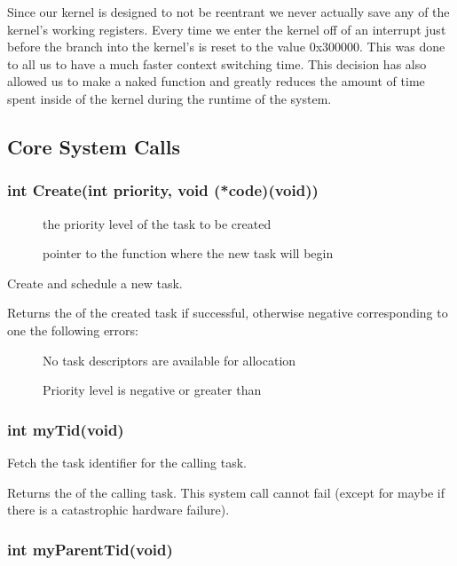 \documentclass[pdftex,10pt,a4paper]{article}
\begin{document}
Since our kernel is designed to not be reentrant we never actually save
any of the kernel's working registers. Every time we enter the kernel off
of an interrupt just before the branch into  the
kernel's  is reset to the value 0x300000. This was done to all us
to have a much faster context switching time. This decision has also
allowed us to make  a naked function and greatly
reduces the amount of time spent inside of the kernel during the runtime
of the system.


\subsection*{Core System Calls}

\subsubsection*{int Create(int priority, void (*code)(void))}

\begin{description}
\item[] the priority level of the task to be created
\item[] pointer to the function where the new task will begin
\end{description}

Create and schedule a new task.

Returns the  of the created task if successful, otherwise
negative corresponding to one the following errors:

\begin{description}
\item[] No task descriptors are available for
  allocation
\item[] Priority level is negative or greater
  than 
\end{description}


\subsubsection*{int myTid(void)}

Fetch the task identifier for the calling task.

Returns the  of the calling task. This system call cannot
fail (except for maybe if there is a catastrophic hardware failure).


\subsubsection*{int myParentTid(void)}
\end{document}
